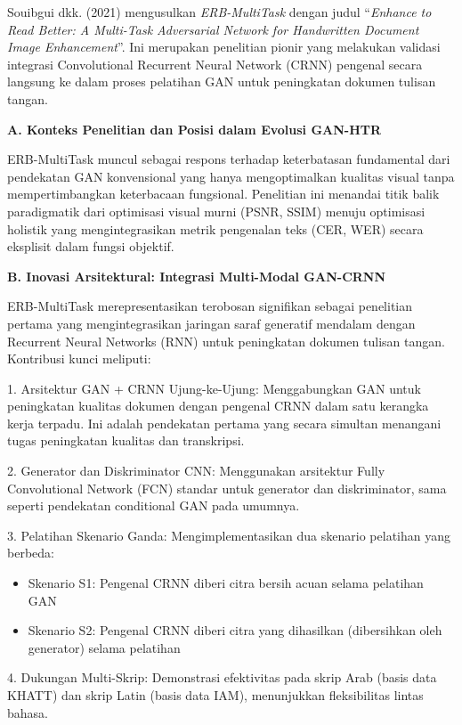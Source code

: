 \documentclass[12pt,a4paper]{article}
\begin{document}
Souibgui dkk. (2021) \cite{erb2021} mengusulkan \textit{ERB-MultiTask} dengan judul ``\textit{Enhance to Read Better: A Multi-Task Adversarial Network for Handwritten Document Image Enhancement}''. Ini merupakan penelitian pionir yang melakukan validasi integrasi Convolutional Recurrent Neural Network (CRNN) pengenal secara langsung ke dalam proses pelatihan GAN untuk peningkatan dokumen tulisan tangan.

\noindent\textbf{A. Konteks Penelitian dan Posisi dalam Evolusi GAN-HTR}

ERB-MultiTask muncul sebagai respons terhadap keterbatasan fundamental dari pendekatan GAN konvensional yang hanya mengoptimalkan kualitas visual tanpa mempertimbangkan keterbacaan fungsional. Penelitian ini menandai titik balik paradigmatik dari optimisasi visual murni (PSNR, SSIM) menuju optimisasi holistik yang mengintegrasikan metrik pengenalan teks (CER, WER) secara eksplisit dalam fungsi objektif.

\noindent\textbf{B. Inovasi Arsitektural: Integrasi Multi-Modal GAN-CRNN}

ERB-MultiTask merepresentasikan terobosan signifikan sebagai penelitian pertama yang mengintegrasikan jaringan saraf generatif mendalam dengan Recurrent Neural Networks (RNN) untuk peningkatan dokumen tulisan tangan. Kontribusi kunci meliputi:

1. Arsitektur GAN + CRNN Ujung-ke-Ujung: Menggabungkan GAN untuk peningkatan kualitas dokumen dengan pengenal CRNN dalam satu kerangka kerja terpadu. Ini adalah pendekatan pertama yang secara simultan menangani tugas peningkatan kualitas dan transkripsi.

2. Generator dan Diskriminator CNN: Menggunakan arsitektur Fully Convolutional Network (FCN) standar untuk generator dan diskriminator, sama seperti pendekatan conditional GAN pada umumnya.

3. Pelatihan Skenario Ganda: Mengimplementasikan dua skenario pelatihan yang berbeda:
\begin{itemize}
 \item Skenario S1: Pengenal CRNN diberi citra bersih acuan selama pelatihan GAN
 \item Skenario S2: Pengenal CRNN diberi citra yang dihasilkan (dibersihkan oleh generator) selama pelatihan
\end{itemize}

4. Dukungan Multi-Skrip: Demonstrasi efektivitas pada skrip Arab (basis data KHATT) dan skrip Latin (basis data IAM), menunjukkan fleksibilitas lintas bahasa.
\end{document}
